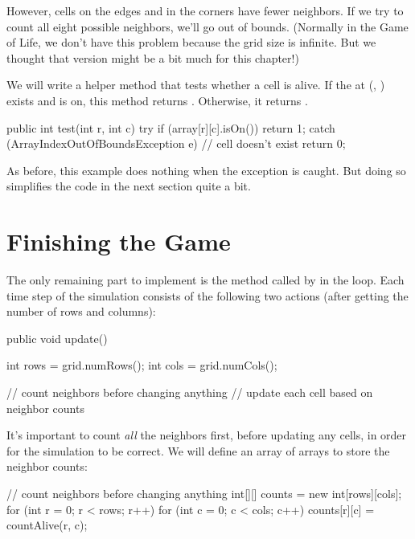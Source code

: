 However, cells on the edges and in the corners have fewer neighbors.
If we try to count all eight possible neighbors, we'll go out of bounds.
(Normally in the Game of Life, we don't have this problem because the grid size is infinite.
But we thought that version might be a bit much for this chapter!)

We will write a helper method that tests whether a cell is alive.
If the  at (, ) exists and is on, this method returns .
Otherwise, it returns .

\begin{code}
public int test(int r, int c) {
    try {
        if (array[r][c].isOn()) {
            return 1;
        }
    } catch (ArrayIndexOutOfBoundsException e) {
        // cell doesn't exist
    }
    return 0;
}
\end{code}

As before, this example does nothing when the exception is caught.
But doing so simplifies the code in the next section quite a bit.


\section{Finishing the Game}
\label{sec:update}

The only remaining part to implement is the  method called by  in the  loop.
Each time step of the simulation consists of the following two actions (after getting the number of rows and columns):

\begin{code}
public void update() {
    int rows = grid.numRows();
    int cols = grid.numCols();

    // count neighbors before changing anything
    // update each cell based on neighbor counts
}
\end{code}

It's important to count {\em all} the neighbors first, before updating any cells, in order for the simulation to be correct.
We will define an array of arrays to store the neighbor counts:

\begin{code}
// count neighbors before changing anything
int[][] counts = new int[rows][cols];
for (int r = 0; r < rows; r++) {
    for (int c = 0; c < cols; c++) {
        counts[r][c] = countAlive(r, c);
    }
}
\end{code}

